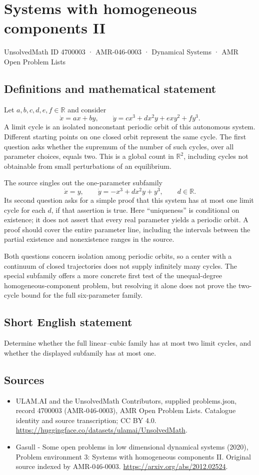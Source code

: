 \documentclass[11pt,a4paper]{article}
\begin{document}
\section*{Systems with homogeneous components II}\label{4700003}
{\small UnsolvedMath ID 4700003 · AMR-046-0003 · Dynamical Systems · AMR Open Problem Lists}
\subsection{Definitions and mathematical statement}
Let $a,b,c,d,e,f\in\mathbb R$ and consider
\[
 \dot x=ax+by,\qquad
 \dot y=cx^3+dx^2y+exy^2+fy^3.
\]
A limit cycle is an isolated nonconstant periodic orbit of this autonomous
system. Different starting points on one closed orbit represent the same
cycle. The first question asks whether the supremum of the number of such
cycles, over all parameter choices, equals two. This is a global count in
$\mathbb R^2$, including cycles not obtainable from small perturbations of
an equilibrium.

The source singles out the one-parameter subfamily
\[
 \dot x=y,\qquad \dot y=-x^3+dx^2y+y^3,
 \qquad d\in\mathbb R.
\]
Its second question asks for a simple proof that this system has at most one
limit cycle for each $d$, if that assertion is true. Here ``uniqueness'' is
conditional on existence; it does not assert that every real parameter yields
a periodic orbit. A proof should cover the entire parameter line, including
the intervals between the partial existence and nonexistence ranges in the
source.

Both questions concern isolation among periodic orbits, so a center with a
continuum of closed trajectories does not supply infinitely many cycles.
The special subfamily offers a more concrete first test of the unequal-degree
homogeneous-component problem, but resolving it alone does not prove the
two-cycle bound for the full six-parameter family.
\subsection{Short English statement}
Determine whether the full linear–cubic family has at most two limit cycles, and whether the displayed subfamily has at most one.
\subsection{Sources}
\begin{itemize}
\item[S1] ULAM.AI and the UnsolvedMath Contributors, supplied problems.json, record 4700003 (AMR-046-0003), AMR Open Problem Lists. Catalogue identity and source transcription; CC BY 4.0.
\url{https://huggingface.co/datasets/ulamai/UnsolvedMath}.
\item[S2] Gasull - Some open problems in low dimensional dynamical systems (2020), Problem environment 3: Systems with homogeneous components II. Original source indexed by AMR-046-0003.
\url{https://arxiv.org/abs/2012.02524}.
\end{itemize}
\end{document}
